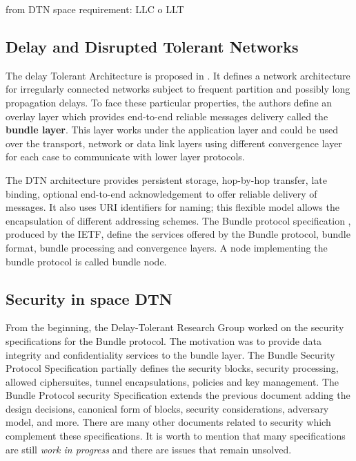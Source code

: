 from DTN space requirement: LLC o LLT


\subsection{Delay and Disrupted Tolerant Networks}

The delay Tolerant Architecture is proposed in \cite{cerf2007delay}. It defines a network architecture for irregularly connected networks subject to frequent partition and possibly long propagation delays. To face these particular properties, the authors define an overlay layer which provides end-to-end reliable messages delivery called the \textbf{bundle layer}. This layer works under the application layer and could be used over the transport, network or data link layers using different convergence layer for each case to communicate with lower layer protocols. 

The DTN architecture provides persistent storage, hop-by-hop transfer, late binding, optional end-to-end acknowledgement to offer reliable delivery of messages. It also uses URI identifiers for naming; this flexible model allows the encapsulation of different addressing schemes. The Bundle protocol specification \cite{rfc5050}, produced by the IETF,  define the services offered by the Bundle protocol, bundle format, bundle processing and convergence layers. A node implementing the bundle protocol is called bundle node. 

 




\subsection{Security in space DTN}


 From the beginning, the Delay-Tolerant Research Group worked on the security specifications for the Bundle protocol. The motivation was to provide data integrity and confidentiality services to the bundle layer. The Bundle Security Protocol Specification \cite{rfc6257} partially defines the security blocks, security processing, allowed ciphersuites, tunnel encapsulations, policies and key management. The Bundle Protocol security Specification \cite{ietf-dtn-bpsec-07} extends the previous document adding the design decisions, canonical form of blocks, security considerations, adversary model, and more.  There are many other documents related to security which complement these specifications.  It is worth to mention that many specifications are still \textit{work in progress} and there are issues that remain unsolved.
 
